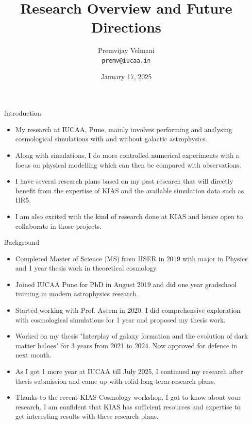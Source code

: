 \documentclass{beamer}
\title[Research Overview]{Research Overview and Future Directions}
\author[Premvijay Velmani]{Premvijay Velmani \\ \texttt{premv@iucaa.in}}
\institute[IUCAA]{Inter-University Centre for Astronomy and Astrophysics (IUCAA)}
\date[KIAS Interview]{January 17, 2025}
\begin{document}
\begin{frame}
    \titlepage
\end{frame}



\begin{frame}{Introduction}
\begin{itemize}
\item My research at IUCAA, Pune, mainly involves performing and analysing cosmological simulations with and without galactic astrophysics.
\item Along with simulations, I do more controlled numerical experiments with a focus on physical modelling which can then be compared with observations.
\item I have several research plans based on my past research that will directly benefit from the expertise of KIAS and the available simulation data such as HR5. 
\item I am also excited with the kind of research done at KIAS and hence open to collaborate in those projects.
\end{itemize}
\end{frame}

\begin{frame}{Background}
    \begin{itemize}
        \item Completed Master of Science (MS) from IISER in 2019 with major in Physics and 1 year thesis work in theoretical cosmology.
        \item Joined IUCAA Pune for PhD in August 2019 and did one year gradschool training in modern astrophysics research.
        \item Started working with Prof. Aseem in 2020. I did comprehensive exploration with cosmological simulations for 1 year and proposed my thesis work.
        \item Worked on my thesis "Interplay of galaxy formation and the evolution of dark matter haloes" for 3 years from 2021 to 2024. Now approved for defence in next month.
        \item As I got 1 more year at IUCAA till July 2025, I continued my research after thesis submission and came up with solid long-term research plans. 
        \item Thanks to the recent KIAS Cosmology workshop, I got to know about your research. I am confident that KIAS has sufficient resources and expertise to get interesting results with these research plans.
    \end{itemize}
\end{frame}
\end{document}
